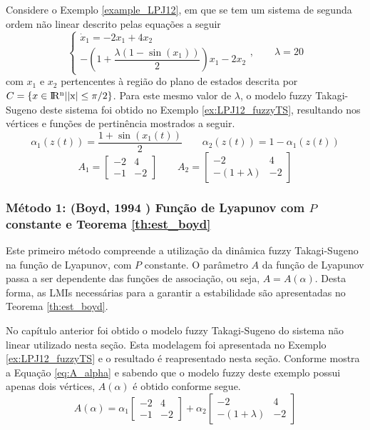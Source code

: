 \begin{example}\label{ex:example2_LPJ12_non_linear_system}
Considere o Exemplo \ref{example_LPJ12}, em que se tem um sistema de segunda ordem não linear descrito pelas equações a seguir
\begin{equation}\label{eq:ex2_LPJ12_non_linear}
\begin{cases}\dot{x}_1 = -2x_1 + 4x_2
\\-(1 + \dfrac{\lambda(1 - \sin(x_1))}{2})x_1 - 2x_2\end{cases},\qquad \lambda = 20
\end{equation}
com $x_1$ e $x_2$ pertencentes à região do plano de estados descrita por $C = \{x \in \rm I\!R^n | |x| \leq \pi/2\}$. Para este mesmo valor de $\lambda$, o modelo fuzzy Takagi-Sugeno deste sistema foi obtido no Exemplo \ref{ex:LPJ12_fuzzyTS}, resultando nos vértices e funções de pertinência mostrados a seguir.
\begin{equation*}
\alpha_1(z(t)) = \dfrac{1+\sin(x_1(t))}{2}\qquad \alpha_2(z(t)) = 1 - \alpha_1(z(t))
\end{equation*}
\begin{equation*}
A_1 = \begin{bmatrix}-2&4\\-1&-2\end{bmatrix}\qquad A_2 = \begin{bmatrix}-2&4\\-(1+\lambda)&-2\end{bmatrix}
\end{equation*}
\end{example}

\subsubsection{Método 1: (Boyd, 1994 \cite{bookboydl:1994}) Função de Lyapunov com $P$ constante e Teorema \ref{th:est_boyd}}

Este primeiro método compreende a utilização da dinâmica fuzzy Takagi-Sugeno na função de Lyapunov, com $P$ constante. O parâmetro $A$ da função de Lyapunov passa a ser dependente das funções de associação, ou seja, $A = A(\alpha)$. Desta forma, as LMIs necessárias para a garantir a estabilidade são apresentadas no Teorema \ref{th:est_boyd}.

No capítulo anterior foi obtido o modelo fuzzy Takagi-Sugeno do sistema não linear utilizado nesta seção. Esta modelagem foi apresentada no Exemplo \ref{ex:LPJ12_fuzzyTS} e o resultado é reapresentado nesta seção. Conforme mostra a Equação \ref{eq:A_alpha} e sabendo que o modelo fuzzy deste exemplo possui apenas dois vértices, $A(\alpha)$ é obtido conforme segue.
\begin{equation*}
A(\alpha) = \alpha_1 \begin{bmatrix}-2&4\\-1&-2\end{bmatrix}+ \alpha_2 \begin{bmatrix}-2&4\\-(1+\lambda)&-2\end{bmatrix}
\end{equation*}

